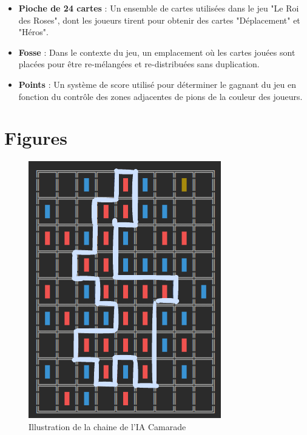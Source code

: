 \begin{itemize}
    \item \textbf{Pioche de 24 cartes} : Un ensemble de cartes utilisées dans le jeu "Le Roi des Roses", dont les joueurs tirent pour obtenir des cartes "Déplacement" et "Héros".

    \item \textbf{Fosse} : Dans le contexte du jeu, un emplacement où les cartes jouées sont placées pour être re-mélangées et re-distribuées sans duplication.

    \item \textbf{Points} : Un système de score utilisé pour déterminer le gagnant du jeu en fonction du contrôle des zones adjacentes de pions de la couleur des joueurs.
\end{itemize}

\chapter{Figures}

\begin{figure}[h]
    \centering
    \includegraphics[width=\textwidth,angle=0]{./images/Camarade.png}
    \caption{Illustration de la chaine de l'IA Camarade}
    \label{fig:cam1}
\end{figure}

